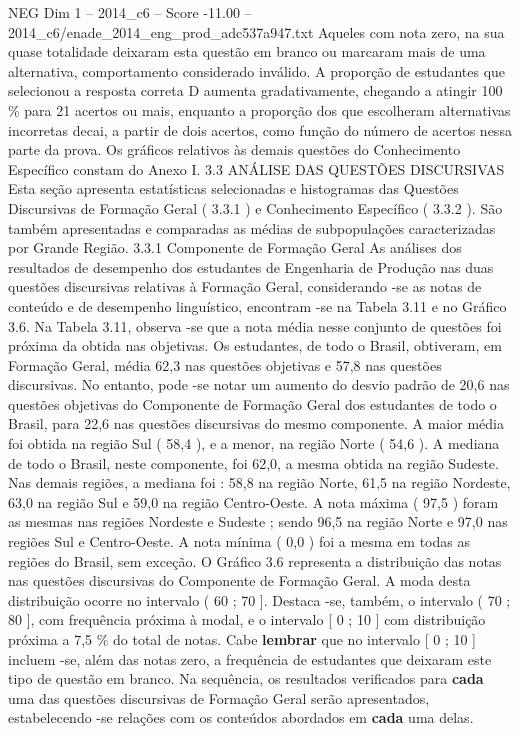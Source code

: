 \begin{textsample}{NEG Dim 1 – 2014\_c6 – Score -11.00 – 2014\_c6/enade\_2014\_eng\_prod\_adc537a947.txt}
Aqueles com nota zero, na sua quase totalidade deixaram esta questão em branco ou marcaram mais de uma alternativa, comportamento considerado inválido.
A proporção de estudantes que selecionou a resposta correta D aumenta gradativamente, chegando a atingir 100 \% para 21 acertos ou mais, enquanto a proporção dos que escolheram alternativas incorretas decai, a partir de dois acertos, como função do número de acertos nessa parte da prova.
Os gráficos relativos às demais questões do Conhecimento Específico constam do Anexo I. 3.3 ANÁLISE DAS QUESTÕES DISCURSIVAS Esta seção apresenta estatísticas selecionadas e histogramas das Questões Discursivas de Formação Geral ( 3.3.1 ) e Conhecimento Específico ( 3.3.2 ).
São também apresentadas e comparadas as médias de subpopulações caracterizadas por Grande Região. 3.3.1 Componente de Formação Geral As análises dos resultados de desempenho dos estudantes de Engenharia de Produção nas duas questões discursivas relativas à Formação Geral, considerando -se as notas de conteúdo e de desempenho linguístico, encontram -se na Tabela 3.11 e no Gráfico 3.6.
Na Tabela 3.11, observa -se que a nota média nesse conjunto de questões foi próxima da obtida nas objetivas.
Os estudantes, de todo o Brasil, obtiveram, em Formação Geral, média 62,3 nas questões objetivas e 57,8 nas questões discursivas.
No entanto, pode -se notar um aumento do desvio padrão de 20,6 nas questões objetivas do Componente de Formação Geral dos estudantes de todo o Brasil, para 22,6 nas questões discursivas do mesmo componente.
A maior média foi obtida na região Sul ( 58,4 ), e a menor, na região Norte ( 54,6 ).
A mediana de todo o Brasil, neste componente, foi 62,0, a mesma obtida na região Sudeste.
Nas demais regiões, a mediana foi : 58,8 na região Norte, 61,5 na região Nordeste, 63,0 na região Sul e 59,0 na região Centro-Oeste.
A nota máxima ( 97,5 ) foram as mesmas nas regiões Nordeste e Sudeste ; sendo 96,5 na região Norte e 97,0 nas regiões Sul e Centro-Oeste.
A nota mínima ( 0,0 ) foi a mesma em todas as regiões do Brasil, sem exceção.
O Gráfico 3.6 representa a distribuição das notas nas questões discursivas do Componente de Formação Geral.
A moda desta distribuição ocorre no intervalo ( 60 ; 70 ].
Destaca -se, também, o intervalo ( 70 ; 80 ], com frequência próxima à modal, e o intervalo [ 0 ; 10 ] com distribuição próxima a 7,5 \% do total de notas.
Cabe \textbf{lembrar} que no intervalo [ 0 ; 10 ] incluem -se, além das notas zero, a frequência de estudantes que deixaram este tipo de questão em branco.
Na sequência, os resultados verificados para \textbf{cada} uma das questões discursivas de Formação Geral serão apresentados, estabelecendo -se relações com os conteúdos abordados em \textbf{cada} uma delas.

\end{textsample}
